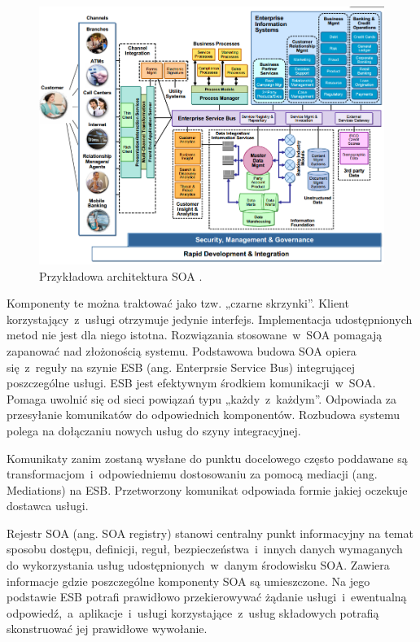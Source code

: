\begin{figure}[h!tbp]
\begin{centering}
\includegraphics[width=15cm]{img/soa_arch.png}
\caption[Przykładowa architektura SOA.]{Przykładowa architektura SOA \cite{EXEntArchSOA}.}\label{PRZArchSOA}
\end{centering}
\end{figure}

Komponenty te można traktować jako tzw. „czarne skrzynki”. Klient korzystający~z~usługi otrzymuje jedynie interfejs. Implementacja udostępnionych metod nie jest dla niego istotna.
Rozwiązania stosowane~w~SOA pomagają zapanować nad złożonością systemu. Podstawowa budowa SOA opiera się~z~reguły na szynie ESB (ang. Enterprsie Service Bus) integrującej poszczególne usługi. ESB jest efektywnym środkiem komunikacji~w~SOA. Pomaga uwolnić się od sieci powiązań typu „każdy~z~każdym”. Odpowiada za przesyłanie komunikatów do odpowiednich komponentów. Rozbudowa systemu polega na dołączaniu nowych usług do szyny integracyjnej. 
	
Komunikaty zanim zostaną wysłane do punktu docelowego często poddawane są transformacjom~i~odpowiedniemu dostosowaniu za pomocą mediacji (ang. Mediations) na ESB. Przetworzony komunikat odpowiada formie jakiej oczekuje dostawca usługi.
	
Rejestr SOA (ang. SOA registry) stanowi centralny punkt informacyjny na temat sposobu dostępu, definicji, reguł, bezpieczeństwa~i~innych danych wymaganych do wykorzystania usług udostępnionych~w~danym środowisku SOA. Zawiera informacje gdzie poszczególne komponenty SOA są umieszczone. Na jego podstawie ESB potrafi prawidłowo przekierowywać żądanie usługi~i~ewentualną odpowiedź,~a~aplikacje~i~usługi korzystające~z~usług składowych potrafią skonstruować jej prawidłowe wywołanie.
	
